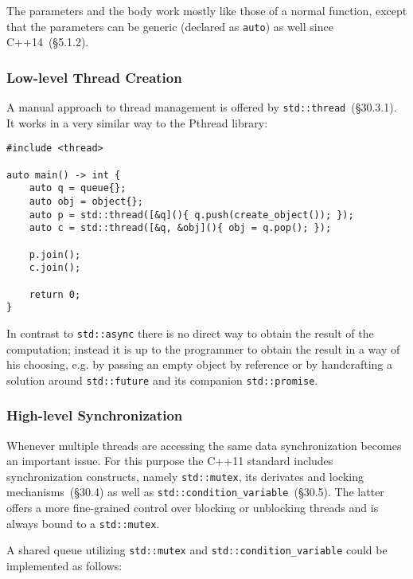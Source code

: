 The parameters and the body work mostly like those of a normal function, except that the parameters can be generic (declared as \texttt{auto}) as well since C++14~\cite{cpp14std}(§5.1.2).

\subsubsection{Low-level Thread Creation}\label{modern:queue:threads}

A manual approach to thread management is offered by \texttt{std::thread}~\cite{cpp11std}(§30.3.1). It works in a very similar way to the Pthread library:

\begin{verbatim}
#include <thread>

auto main() -> int {
    auto q = queue{};
    auto obj = object{};
    auto p = std::thread([&q](){ q.push(create_object()); });
    auto c = std::thread([&q, &obj](){ obj = q.pop(); });
    
    p.join();
    c.join();
    
    return 0;
}
\end{verbatim}

\noindent In contrast to \texttt{std::async} there is no direct way to obtain the result of the computation; instead it is up to the programmer to obtain the result in a way of his choosing, e.g. by passing an empty object by reference or by handcrafting a solution around \texttt{std::future} and its companion \texttt{std::promise}.

\subsubsection{High-level Synchronization}\label{modern:queue:mutex}

Whenever multiple threads are accessing the same data synchronization becomes an important issue. For this purpose the C++11 standard includes synchronization constructs, namely \texttt{std::mutex}, its derivates and locking mechanisms~\cite{cpp11std}(§30.4) as well as \texttt{std::condition\_variable}~\cite{cpp11std}(§30.5). The latter offers a more fine-grained control over blocking or unblocking threads and is always bound to a \texttt{std::mutex}.

A shared queue utilizing \texttt{std::mutex} and \texttt{std::condition\_variable} could be implemented as follows:

